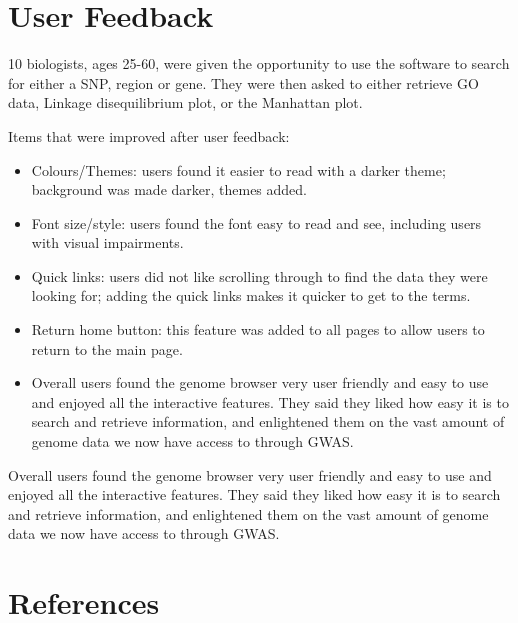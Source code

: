 \documentclass[12pt,a4paper]{article}
\newcommand{\sect}[1]{
\clearpage
\hypertarget{#1}{
\section{#1}\label{#1}}
}
\begin{document}
\sect{User Feedback}
10 biologists, ages 25-60, were given the opportunity to use the software to search for either a SNP, region or gene. They were then asked to either retrieve GO data, Linkage disequilibrium plot, or the Manhattan plot.

Items that were improved after user feedback:

\begin{itemize}
\item Colours/Themes: users found it easier to read with a darker theme; background was made darker, themes added.
\item Font size/style: users found the font easy to read and see, including users with visual impairments.
\item Quick links: users did not like scrolling through to find the data they were looking for; adding the quick links makes it quicker to get to the terms.
\item Return home button: this feature was added to all pages to allow users to return to the main page.
\item Overall users found the genome browser very user friendly and easy to use and enjoyed all the interactive features. They said they liked how easy it is to search and retrieve information, and enlightened them on the vast amount of genome data we now have access to through GWAS.
\end{itemize}

Overall users found the genome browser very user friendly and easy to use and enjoyed all the interactive features. They said they liked how easy it is to search and retrieve information, and enlightened them on the vast amount of genome data we now have access to through GWAS.

\sect{References}
\end{document}

